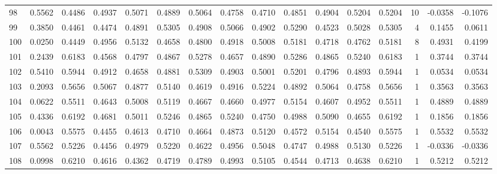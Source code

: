 \begin{tabular}{lrrrrrrrrrrrrrrr}
98  &      0.5562 &  0.4486 &  0.4937 &  0.5071 &  0.4889 &  0.5064 &  0.4758 &  0.4710 &  0.4851 &  0.4904 &   0.5204 &     0.5204 &     10 &                   -0.0358 &                    -0.1076 \\
99  &      0.3850 &  0.4461 &  0.4474 &  0.4891 &  0.5305 &  0.4908 &  0.5066 &  0.4902 &  0.5290 &  0.4523 &   0.5028 &     0.5305 &      4 &                    0.1455 &                     0.0611 \\
100 &      0.0250 &  0.4449 &  0.4956 &  0.5132 &  0.4658 &  0.4800 &  0.4918 &  0.5008 &  0.5181 &  0.4718 &   0.4762 &     0.5181 &      8 &                    0.4931 &                     0.4199 \\
101 &      0.2439 &  0.6183 &  0.4568 &  0.4797 &  0.4867 &  0.5278 &  0.4657 &  0.4890 &  0.5286 &  0.4865 &   0.5240 &     0.6183 &      1 &                    0.3744 &                     0.3744 \\
102 &      0.5410 &  0.5944 &  0.4912 &  0.4658 &  0.4881 &  0.5309 &  0.4903 &  0.5001 &  0.5201 &  0.4796 &   0.4893 &     0.5944 &      1 &                    0.0534 &                     0.0534 \\
103 &      0.2093 &  0.5656 &  0.5067 &  0.4877 &  0.5140 &  0.4619 &  0.4916 &  0.5224 &  0.4892 &  0.5064 &   0.4758 &     0.5656 &      1 &                    0.3563 &                     0.3563 \\
104 &      0.0622 &  0.5511 &  0.4643 &  0.5008 &  0.5119 &  0.4667 &  0.4660 &  0.4977 &  0.5154 &  0.4607 &   0.4952 &     0.5511 &      1 &                    0.4889 &                     0.4889 \\
105 &      0.4336 &  0.6192 &  0.4681 &  0.5011 &  0.5246 &  0.4865 &  0.5240 &  0.4750 &  0.4988 &  0.5090 &   0.4655 &     0.6192 &      1 &                    0.1856 &                     0.1856 \\
106 &      0.0043 &  0.5575 &  0.4455 &  0.4613 &  0.4710 &  0.4664 &  0.4873 &  0.5120 &  0.4572 &  0.5154 &   0.4540 &     0.5575 &      1 &                    0.5532 &                     0.5532 \\
107 &      0.5562 &  0.5226 &  0.4456 &  0.4979 &  0.5220 &  0.4622 &  0.4956 &  0.5048 &  0.4747 &  0.4988 &   0.5130 &     0.5226 &      1 &                   -0.0336 &                    -0.0336 \\
108 &      0.0998 &  0.6210 &  0.4616 &  0.4362 &  0.4719 &  0.4789 &  0.4993 &  0.5105 &  0.4544 &  0.4713 &   0.4638 &     0.6210 &      1 &                    0.5212 &                     0.5212 \\

\end{tabular}
